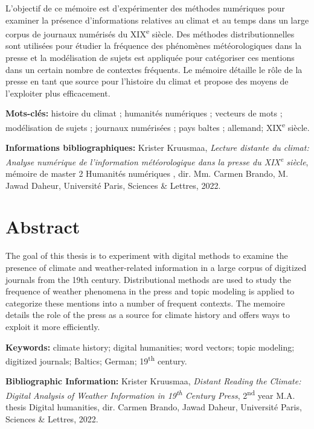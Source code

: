 \documentclass[a4paper,twoside,12pt]{article}
\begin{document}
L'objectif de ce mémoire est d'expérimenter des méthodes numériques pour examiner la présence d'informations relatives au climat et au temps dans un large corpus de journaux numérisés du XIX\textsuperscript{e} siècle. Des méthodes distributionnelles sont utilisées pour étudier la fréquence des phénomènes météorologiques dans la presse et la modélisation de sujets est appliquée pour catégoriser ces mentions dans un certain nombre de contextes fréquents. Le mémoire détaille le rôle de la presse en tant que source pour l'histoire du climat et propose des moyens de l'exploiter plus efficacement.

\medskip

\textbf{Mots-clés:} histoire du climat ; humanités numériques ; vecteurs de mots ; modélisation de sujets ; journaux numérisées ; pays baltes ; allemand; XIX\textsuperscript{e} siècle.

\textbf{Informations bibliographiques:} Krister Kruusmaa, \textit{Lecture distante du climat: Analyse numérique de l'information météorologique dans la presse du XIX\textsuperscript{e} siècle}, mémoire de master 2 \og Humanités numériques \fg{}, dir. Mm. Carmen Brando, M. Jawad Daheur, Université Paris, Sciences \& Lettres, 2022.


\section*{Abstract}

The goal of this thesis is to experiment with digital methods to examine the presence of climate and weather-related information in a large corpus of digitized journals from the 19th century. Distributional methods are used to study the frequence of weather phenomena in the press and topic modeling is applied to categorize these mentions into a number of frequent contexts. The memoire details the role of the press as a source for climate history and offers ways to exploit it more efficiently.

\medskip

\textbf{Keywords:} climate history; digital humanities; word vectors; topic modeling; digitized journals; Baltics; German; 19\textsuperscript{th} century.

\textbf{Bibliographic Information:} Krister Kruusmaa, \textit{Distant Reading the Climate: Digital Analysis of Weather Information in 19\textsuperscript{th} Century Press}, 2\textsuperscript{nd} year M.A. thesis  \og Digital humanities\fg{}, dir. Carmen Brando, Jawad Daheur, Université Paris, Sciences \& Lettres, 2022.
\end{document}
